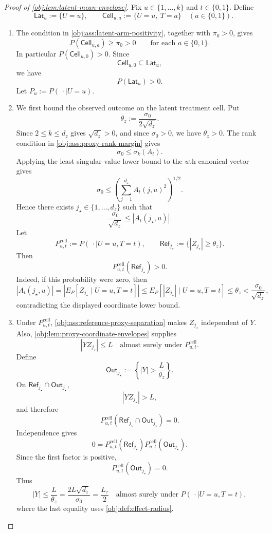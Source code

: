\documentclass[11pt]{article}
\begin{document}
\begin{proof}[Proof of \cref{obj:lem:latent-mean-envelope}]
Fix \(u\in\{1,\ldots,k\}\) and \(t\in\{0,1\}\). Define
\[
\mathsf{Lat}_u:=\{U=u\},
\qquad
\mathsf{Cell}_{u,a}:=\{U=u,\ T=a\}\quad(a\in\{0,1\}).
\]
\begin{enumerate}
\item The condition in \cref{obj:ass:latent-arm-positivity}, together with \(\pi_0>0\), gives
\[
P(\mathsf{Cell}_{u,a})\ge \pi_0>0
\qquad\text{for each }a\in\{0,1\}.
\]
In particular \(P(\mathsf{Cell}_{u,0})>0\). Since
\[
\mathsf{Cell}_{u,0}\subseteq \mathsf{Lat}_u,
\]
we have
\[
P(\mathsf{Lat}_u)>0 .
\]
Let \(P_u:=P(\,\cdot\mid U=u)\). %

\item We first bound the observed outcome on the latent treatment cell. Put
\[
\theta_z:=\frac{\sigma_0}{2\sqrt{d_z}}.
\]
Since \(2\le k\le d_z\) gives \(\sqrt{d_z}>0\), and since \(\sigma_0>0\), we have \(\theta_z>0\). The rank condition in \cref{obj:ass:proxy-rank-margin} gives
\[
\sigma_0\le \sigma_k(A_t).
\]
Applying the least-singular-value lower bound to the \(u\)th canonical vector gives
\[
\sigma_0
\le
\left(\sum_{j=1}^{d_z} A_t(j,u)^2\right)^{1/2}.
\]
Hence there exists \(j_\star\in\{1,\ldots,d_z\}\) such that
\[
\frac{\sigma_0}{\sqrt{d_z}}\le |A_t(j_\star,u)|.
\]
Let
\[
P_{u,t}^{\mathrm{cell}}:=P(\,\cdot\mid U=u,T=t),
\qquad
\mathsf{Ref}_{j_\star}:=\{|Z_{j_\star}|\ge \theta_z\}.
\]
Then
\[
P_{u,t}^{\mathrm{cell}}(\mathsf{Ref}_{j_\star})>0.
\]
Indeed, if this probability were zero, then
\[
|A_t(j_\star,u)|
=
\left|E_P[Z_{j_\star}\mid U=u,T=t]\right|
\le
E_P[|Z_{j_\star}|\mid U=u,T=t]
\le
\theta_z
<
\frac{\sigma_0}{\sqrt{d_z}},
\]
contradicting the displayed coordinate lower bound. %

\item Under \(P_{u,t}^{\mathrm{cell}}\), \cref{obj:ass:reference-proxy-separation} makes \(Z_{j_\star}\) independent of \(Y\). Also, \cref{obj:lem:proxy-coordinate-envelopes} supplies
\[
|Y Z_{j_\star}|\le L
\quad\text{almost surely under }P_{u,t}^{\mathrm{cell}}.
\]
Define
\[
\mathsf{Out}_{j_\star}
:=
\left\{|Y|>\frac{L}{\theta_z}\right\}.
\]
On \(\mathsf{Ref}_{j_\star}\cap\mathsf{Out}_{j_\star}\),
\[
|Y Z_{j_\star}|>L,
\]
and therefore
\[
P_{u,t}^{\mathrm{cell}}(\mathsf{Ref}_{j_\star}\cap\mathsf{Out}_{j_\star})=0.
\]
Independence gives
\[
0
=
P_{u,t}^{\mathrm{cell}}(\mathsf{Ref}_{j_\star})
P_{u,t}^{\mathrm{cell}}(\mathsf{Out}_{j_\star}).
\]
Since the first factor is positive,
\[
P_{u,t}^{\mathrm{cell}}(\mathsf{Out}_{j_\star})=0.
\]
Thus
\[
|Y|\le \frac{L}{\theta_z}
=
\frac{2L\sqrt{d_z}}{\sigma_0}
=
\frac{L_\tau}{2}
\quad\text{almost surely under }P(\,\cdot\mid U=u,T=t),
\]
where the last equality uses \cref{obj:def:effect-radius}. %


\end{enumerate}
\end{proof}
\end{document}
